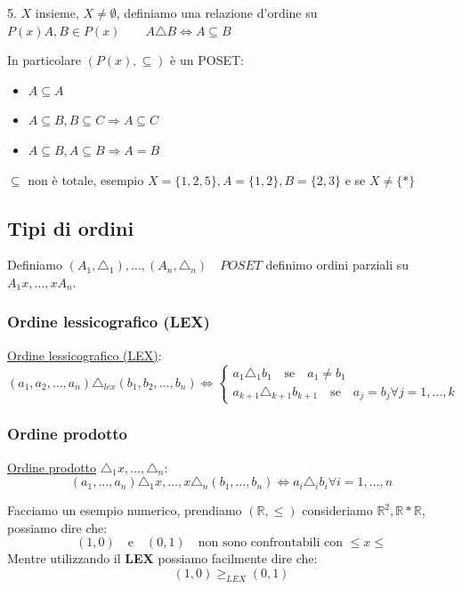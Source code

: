\documentclass{article}
\begin{document}
5. $ X $ insieme, $ X \not = \emptyset $, definiamo una relazione d'ordine su $ P(x)  A,B \in P(x) \quad \quad A \triangle B \Leftrightarrow A \subseteq B $ \par
In particolare $ (P(x), \subseteq )$ è un POSET:\newline
\begin{itemize}
        \item $ A \subseteq A $
        \item $ A \subseteq B, B \subseteq C \Rightarrow A \subseteq C $
        \item $ A \subseteq B, A \subseteq B \Rightarrow A = B $
\end{itemize}
$ \subseteq $ non è totale, esempio $ X = \{1,2,5\}, A = \{1,2\}, B = \{2,3\} $ e se $ X \not = \{*\} $


\subsection{Tipi di ordini}
Definiamo $(A_1, \triangle_1), \ldots, (A_n, \triangle_n) \quad POSET$ definimo ordini parziali su $A_1x, \ldots, xA_n$. \newline


\subsubsection{Ordine lessicografico (LEX)}
\underline{Ordine lessicografico (LEX)}:
\[ 
(a_1,a_2,\ldots, a_n) \triangle_{lex} (b_1,b_2,\ldots, b_n) \Leftrightarrow   
\begin{cases}
        a_1 \triangle_1 b_1 \quad \mbox{se} \quad  a_1 \not = b_1 \\
        a_{k+1} \triangle_{k+1} b_{k+1} \quad \mbox{se} \quad  a_j = b_j \forall j = 1,\ldots, k
\end{cases}
\]


\subsubsection{Ordine prodotto}
\underline{Ordine prodotto} $\triangle_1x,\ldots,\triangle_n$:
\begin{equation*}
        (a_1,\ldots,a_n) \triangle_1x,\ldots, x\triangle_n(b_1,\ldots,b_n) \Leftrightarrow a_i \triangle_i b_i \forall i = 1,\ldots,n
\end{equation*}

Facciamo un esempio numerico, prendiamo $(\mathbb{R}, \le)$ consideriamo $\mathbb{R}^2, \mathbb{R}*\mathbb{R}$, possiamo dire che:
\begin{equation*}
        (1, 0) \quad \mbox{e} \quad (0,1) \quad \mbox{non sono confrontabili con $\le x \le$}
\end{equation*}
Mentre utilizzando il \textbf{LEX} possiamo facilmente dire che:
\begin{equation*}
        (1, 0) \ge_{LEX} (0,1)
\end{equation*}
\end{document}
